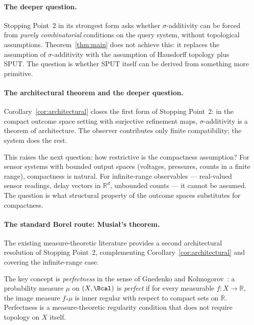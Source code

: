 \paragraph{The deeper question.}
Stopping Point~2 in its strongest form asks whether $\sigma$-additivity
can be forced from \emph{purely combinatorial} conditions on the
query system, without topological assumptions.  Theorem~\ref{thm:main}
does not achieve this: it replaces the assumption of
$\sigma$-additivity with the assumption of Hausdorff topology plus
SPUT.  The question is whether SPUT itself can be derived from
something more primitive.

\paragraph{The architectural theorem and the deeper question.}
Corollary~\ref{cor:architectural} closes the first form of
Stopping Point~2: in the compact outcome space setting with
surjective refinement maps, $\sigma$-additivity is a theorem of
architecture.  The observer contributes only finite compatibility;
the system does the rest.

This raises the next question: how restrictive is the compactness
assumption?  For sensor systems with bounded output spaces (voltages,
pressures, counts in a finite range), compactness is natural.  For
infinite-range observables --- real-valued sensor readings, delay
vectors in $\mathbb{R}^d$, unbounded counts --- it cannot be assumed.
The question is what structural property of the outcome spaces
substitutes for compactness.

\paragraph{The standard Borel route: Musia{\l}'s theorem.}
The existing measure-theoretic literature provides a second
architectural resolution of Stopping Point~2, complementing
Corollary~\ref{cor:architectural} and covering the infinite-range
case.

The key concept is \emph{perfectness} in the sense of Gnedenko and
Kolmogorov~\cite{Bogachev2007}: a probability measure $\mu$ on
$(X, \Bcal)$ is \emph{perfect} if for every measurable $f: X \to
\mathbb{R}$, the image measure $f_*\mu$ is inner regular with respect
to compact sets on $\mathbb{R}$.  Perfectness is a measure-theoretic
regularity condition that does not require topology on $X$ itself.

